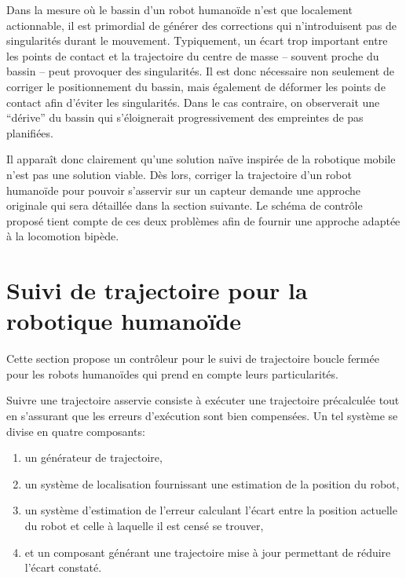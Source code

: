 Dans la mesure où le bassin d'un robot humanoïde n'est que localement
actionnable, il est primordial de générer des corrections qui
n'introduisent pas de singularités durant le mouvement. Typiquement,
un écart trop important entre les points de contact et la trajectoire
du centre de masse -- souvent proche du bassin -- peut provoquer des
singularités. Il est donc nécessaire non seulement de corriger le
positionnement du bassin, mais également de déformer les points de
contact afin d'éviter les singularités. Dans le cas contraire, on
observerait une ``dérive'' du bassin qui s'éloignerait progressivement
des empreintes de pas planifiées.

Il apparaît donc clairement qu'une solution naïve inspirée de la
robotique mobile n'est pas une solution viable. Dès lors, corriger la
trajectoire d'un robot humanoïde pour pouvoir s'asservir sur un
capteur demande une approche originale qui sera détaillée dans la
section suivante. Le schéma de contrôle proposé tient compte de ces
deux problèmes afin de fournir une approche adaptée à la locomotion
bipède.

\section{Suivi de trajectoire pour la robotique humanoïde}\label{closedloop}


Cette section propose un contrôleur pour le suivi de trajectoire
boucle fermée pour les robots humanoïdes qui prend en compte leurs
particularités.

Suivre une trajectoire asservie consiste à exécuter une trajectoire
précalculée tout en s'assurant que les erreurs d'exécution sont bien
compensées. Un tel système se divise en quatre composants:

\begin{enumerate}
\item un générateur de trajectoire,
\item un système de localisation fournissant une estimation de la position du robot,
\item un système d'estimation de l'erreur calculant l'écart entre la
  position actuelle du robot et celle à laquelle il est censé se
  trouver,
\item et un composant générant une trajectoire mise à jour permettant
  de réduire l'écart constaté.
\end{enumerate}


